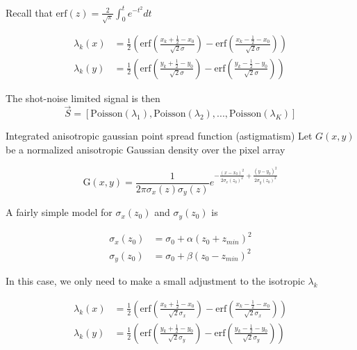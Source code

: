 \documentclass[aspectratio=169]{beamer}
\begin{document}
\begin{frame}

Recall that $\mathrm{erf}(z) = \frac{2}{\sqrt{\pi}}\int_{0}^{t}e^{-t^{2}}dt$ 

\begin{align*}
\lambda_{k}(x) &= \frac{1}{2}\left(\mathrm{erf}\left(\frac{x_{k}+\frac{1}{2}-x_{0}}{\sqrt{2}\sigma}\right) -\mathrm{erf}\left(\frac{x_{k}-\frac{1}{2}-x_{0}}{\sqrt{2}\sigma}\right)\right)\\
\lambda_{k}(y) &= \frac{1}{2}\left(\mathrm{erf}\left(\frac{y_{k}+\frac{1}{2}-y_{0}}{\sqrt{2}\sigma}\right) -\mathrm{erf}\left(\frac{y_{k}-\frac{1}{2}-y_{0}}{\sqrt{2}\sigma}\right)\right)
\end{align*}

The shot-noise limited signal is then
\begin{equation*}
\vec{S} = \left[\mathrm{Poisson}(\lambda_{1}), \mathrm{Poisson}(\lambda_{2}), ..., \mathrm{Poisson}(\lambda_{K})\right]
\end{equation*}

\end{frame}


\begin{frame}{Integrated anisotropic gaussian point spread function (astigmatism)}
Let $G(x,y)$ be a normalized anisotropic Gaussian density over the pixel array

\begin{equation}
\mathrm{G}(x,y) = \frac{1}{2\pi\sigma_{x}(z)\sigma_{y}(z)}e^{-\frac{(x-x_{0})^{2}}{2\sigma_{x}(z_{0})^{2}}+\frac{(y-y_{0})^{2}}{2\sigma_{y}(z_{0})^{2}}}
\end{equation}

A fairly simple model for $\sigma_{x}(z_{0})$ and $\sigma_{y}(z_{0})$ is

\begin{align*}
\sigma_{x}(z_{0}) &= \sigma_{0} + \alpha(z_{0}+z_{min})^{2}\\
\sigma_{y}(z_{0}) &= \sigma_{0} + \beta(z_{0}-z_{min})^{2}
\end{align*}

\end{frame}

\begin{frame}

In this case, we only need to make a small adjustment to the isotropic $\lambda_{k}$

\begin{align*}
\lambda_{k}(x) &= \frac{1}{2}\left(\mathrm{erf}\left(\frac{x_{k}+\frac{1}{2}-x_{0}}{\sqrt{2}\sigma_{x}}\right) -\mathrm{erf}\left(\frac{x_{k}-\frac{1}{2}-x_{0}}{\sqrt{2}\sigma_{x}}\right)\right)\\
\lambda_{k}(y) &= \frac{1}{2}\left(\mathrm{erf}\left(\frac{y_{k}+\frac{1}{2}-y_{0}}{\sqrt{2}\sigma_{y}}\right) -\mathrm{erf}\left(\frac{y_{k}-\frac{1}{2}-y_{0}}{\sqrt{2}\sigma_{y}}\right)\right)
\end{align*}

\end{frame}
\end{document}
